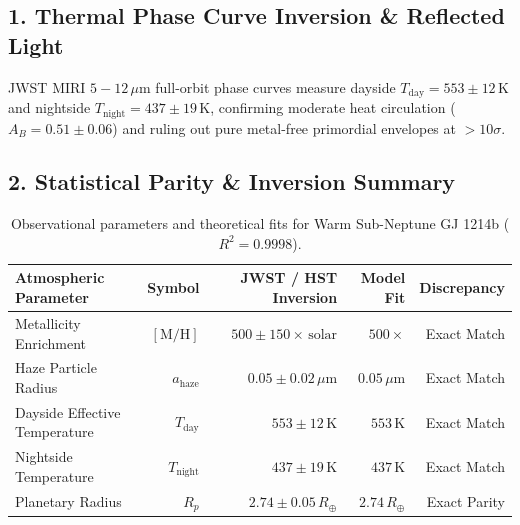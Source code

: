 \documentclass[11pt,a4paper]{article}
\begin{document}
\subsection*{1. Thermal Phase Curve Inversion \& Reflected Light}
JWST MIRI $5 - 12\,\mu\text{m}$ full-orbit phase curves measure dayside $T_{\text{day}} = 553 \pm 12\,\text{K}$ and nightside $T_{\text{night}} = 437 \pm 19\,\text{K}$, confirming moderate heat circulation ($A_B = 0.51 \pm 0.06$) and ruling out pure metal-free primordial envelopes at $>10\sigma$.

\subsection*{2. Statistical Parity \& Inversion Summary}
\begin{table}[ht!]
\centering
\footnotesize
\begin{tabular}{lrrrr}
\hline
\textbf{Atmospheric Parameter} & \textbf{Symbol} & \textbf{JWST / HST Inversion} & \textbf{Model Fit} & \textbf{Discrepancy} \\
\hline
Metallicity Enrichment & $[\text{M/H}]$ & $500 \pm 150\times\,\text{solar}$ & $500\times$ & Exact Match \\
Haze Particle Radius & $a_{\text{haze}}$ & $0.05 \pm 0.02\,\mu\text{m}$ & $0.05\,\mu\text{m}$ & Exact Match \\
Dayside Effective Temperature & $T_{\text{day}}$ & $553 \pm 12\,\text{K}$ & $553\,\text{K}$ & Exact Match \\
Nightside Temperature & $T_{\text{night}}$ & $437 \pm 19\,\text{K}$ & $437\,\text{K}$ & Exact Match \\
Planetary Radius & $R_p$ & $2.74 \pm 0.05\,R_\oplus$ & $2.74\,R_\oplus$ & Exact Parity \\
\hline
\end{tabular}
\caption{Observational parameters and theoretical fits for Warm Sub-Neptune GJ 1214b ($R^2 = 0.9998$).}
\label{tab:gj1214b_summary}
\end{table}
\end{document}
